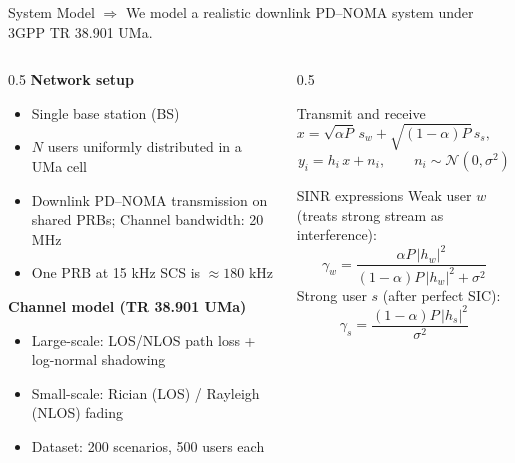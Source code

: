 \documentclass[aspectratio=169]{beamer}
\begin{document}
\begin{frame}{System Model}
  \vspace{-0.2cm}
  \small $\Rightarrow$ We model a realistic downlink PD–NOMA system under 3GPP TR 38.901 UMa.

  \begin{columns}[T,onlytextwidth]
    \begin{column}{0.5\textwidth}
      \textbf{Network setup}
      \begin{itemize} \vspace{-.25cm}
        \item Single base station (BS)
        \item $N$ users uniformly distributed in a UMa cell
        \item Downlink PD–NOMA transmission on shared PRBs; Channel bandwidth: 20 MHz
       
        \item One PRB at 15 kHz SCS is $\approx 180$ kHz 
      \end{itemize}
      \textbf{Channel model (TR 38.901 UMa)}
      \begin{itemize}
        \item Large-scale: LOS/NLOS path loss + log-normal shadowing
        \item Small-scale: Rician (LOS) / Rayleigh (NLOS) fading
        \item Dataset: 200 scenarios, 500 users each
      \end{itemize}
    \end{column}
    \vspace{-.2cm}
    \begin{column}{0.5\textwidth} \vspace{-.4cm}
      \begin{block}{Transmit and receive}
        \begin{equation*}
          x = \sqrt{\alpha P}\,s_w + \sqrt{(1-\alpha)P}\,s_s,\qquad 0<\alpha<1
        \end{equation*}
        \begin{equation*}
          y_i = h_i\,x + n_i,\qquad n_i \sim \mathcal{N}(0,\sigma^2)
        \end{equation*}
      \end{block}
        \vspace{-.3cm}
      \begin{block}{SINR expressions}
        Weak user $w$ (treats strong stream as interference):
        \begin{equation*}
          \gamma_w = \frac{\alpha P\,|h_w|^2}{(1-\alpha)P\,|h_w|^2 + \sigma^2}
        \end{equation*}
        Strong user $s$ (after perfect SIC):
        \begin{equation*}
          \gamma_s = \frac{(1-\alpha)P\,|h_s|^2}{\sigma^2}
        \end{equation*}
      \end{block}
    \end{column}
  \end{columns}


\end{frame}
\end{document}
